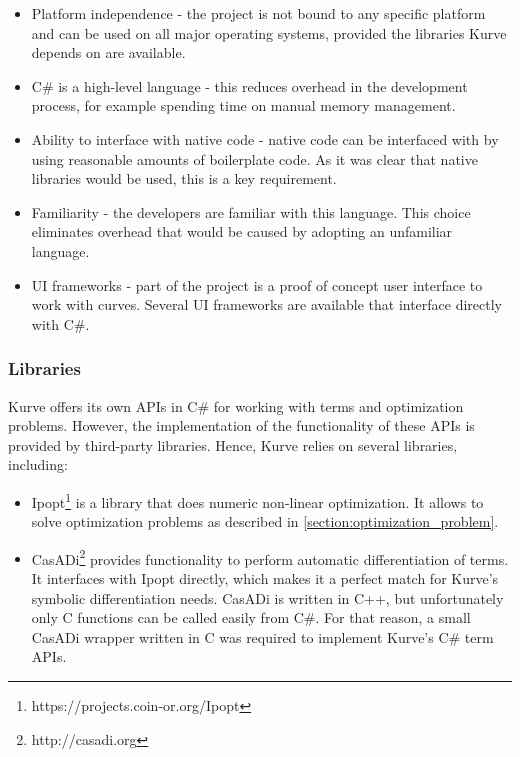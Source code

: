\documentclass[a4paper]{article}
\begin{document}
				\begin{itemize}
				  	\item Platform independence - the project is not bound to any specific platform and can be used on all major operating systems, provided the libraries Kurve depends on are available. 
				  	\item C\# is a high-level language - this reduces overhead in the development process, for example spending time on manual memory management.
					\item Ability to interface with native code - native code can be interfaced with by using reasonable amounts of boilerplate code. As it was clear that native libraries would be used, this is a key requirement.
					\item Familiarity - the developers are familiar with this language. This choice eliminates overhead that would be caused by adopting an unfamiliar language.
					\item UI frameworks - part of the project is a proof of concept user interface to work with curves. Several UI frameworks are available that interface directly with C\#.
				\end{itemize}
			
			\subsubsection{Libraries}
				
				Kurve offers its own APIs in C\# for working with terms and optimization problems. However, the implementation of the functionality of these APIs is provided by third-party libraries. Hence, Kurve relies on several libraries, including:
				
				\begin{itemize}
				  	\item Ipopt\footnote{https://projects.coin-or.org/Ipopt} is a library that does numeric non-linear optimization. It allows to solve optimization problems as described in \ref{section:optimization_problem}.
					\item CasADi\footnote{http://casadi.org} provides functionality to perform automatic differentiation of terms. It interfaces with Ipopt directly, which makes it a perfect match for Kurve's symbolic differentiation needs. CasADi is written in C++, but unfortunately only C functions can be called easily from C\#. For that reason, a small CasADi wrapper written in C was required to implement Kurve's C\# term APIs. 
				\end{itemize}
			
\end{document}
